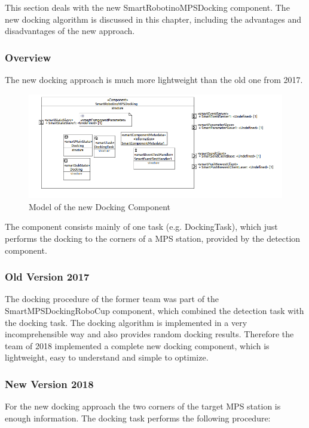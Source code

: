 This section deals with the new SmartRobotinoMPSDocking component. The new docking algorithm is discussed in this chapter, including the advantages and disadvantages of the new approach.

\subsubsection{Overview}

The new docking approach is much more lightweight than the old one from 2017.

\begin{figure}[h]
\centering
\includegraphics[scale=0.4]{pic/dockingComponent.png}
\caption{Model of the new Docking Component }
\label{fig:i_overview}
\end{figure}

The component consists mainly of one task (e.g. DockingTask), which just performs the docking to the corners of a MPS station, provided by the detection component.

\subsubsection{Old Version 2017}

The docking procedure of the former team was part of the SmartMPSDockingRoboCup component, which combined the detection task with the docking task.
The docking algorithm is implemented in a very incomprehensible way and also provides random docking results. Therefore the team of 2018 implemented a complete new docking component, which is lightweight, easy to understand and simple to optimize.

\subsubsection{New Version 2018}

For the new docking approach the two corners of the target MPS station is enough information. The docking task performs the following procedure:

